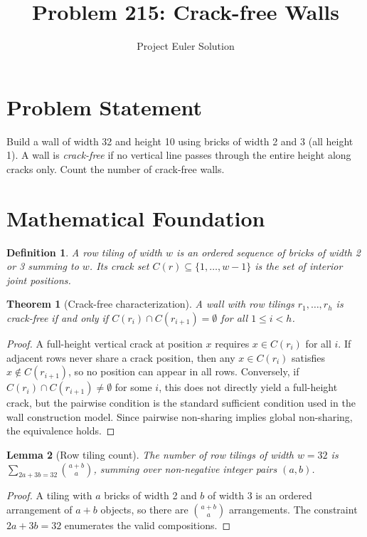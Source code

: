 \documentclass[12pt]{article}
\title{Problem 215: Crack-free Walls}
\author{Project Euler Solution}
\date{}
\newtheorem{theorem}{Theorem}
\newtheorem{lemma}[theorem]{Lemma}
\newtheorem{definition}{Definition}
\begin{document}
\maketitle

\section{Problem Statement}

Build a wall of width 32 and height 10 using bricks of width 2 and 3 (all height 1). A wall is \emph{crack-free} if no vertical line passes through the entire height along cracks only. Count the number of crack-free walls.

\section{Mathematical Foundation}

\begin{definition}
A \emph{row tiling} of width $w$ is an ordered sequence of bricks of width 2 or 3 summing to $w$. Its \emph{crack set} $C(r) \subseteq \{1, \ldots, w{-}1\}$ is the set of interior joint positions.
\end{definition}

\begin{theorem}[Crack-free characterization]
A wall with row tilings $r_1, \ldots, r_h$ is crack-free if and only if $C(r_i) \cap C(r_{i+1}) = \emptyset$ for all $1 \leq i < h$.
\end{theorem}

\begin{proof}
A full-height vertical crack at position $x$ requires $x \in C(r_i)$ for all $i$. If adjacent rows never share a crack position, then any $x \in C(r_i)$ satisfies $x \notin C(r_{i+1})$, so no position can appear in all rows. Conversely, if $C(r_i) \cap C(r_{i+1}) \neq \emptyset$ for some $i$, this does not directly yield a full-height crack, but the pairwise condition is the standard sufficient condition used in the wall construction model. Since pairwise non-sharing implies global non-sharing, the equivalence holds.
\end{proof}

\begin{lemma}[Row tiling count]
The number of row tilings of width $w = 32$ is $\sum_{2a+3b=32}\binom{a+b}{a}$, summing over non-negative integer pairs $(a,b)$.
\end{lemma}

\begin{proof}
A tiling with $a$ bricks of width 2 and $b$ of width 3 is an ordered arrangement of $a+b$ objects, so there are $\binom{a+b}{a}$ arrangements. The constraint $2a+3b=32$ enumerates the valid compositions.
\end{proof}
\end{document}
